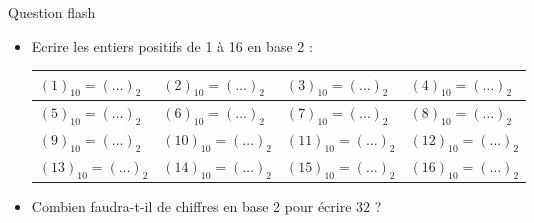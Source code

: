 \documentclass[10pt]{beamer}
\begin{document}
\begin{frame}
	\mframe{\Encodage}
	\begin{exampleblock}{\textcolor{yellow}{\flash} {Question flash}}
		\begin{itemize}
			\item<1-> Ecrire les entiers positifs de 1 à 16 en base 2 :
			      \renewcommand{\arraystretch}{1.5}
			      \begin{tabularx}{0.92\textwidth}{|X|X|X|X|}
				      \hline
				      $(1)_{10}= (\dots)_2$  & $(2)_{10}= (\dots)_2$  & $(3)_{10}= (\dots)_2$  & $(4)_{10}= (\dots)_2$  \\
				      \hline
				      $(5)_{10}= (\dots)_2$  & $(6)_{10}= (\dots)_2$  & $(7)_{10}= (\dots)_2$  & $(8)_{10}= (\dots)_2$  \\
				      \hline
				      $(9)_{10}= (\dots)_2$  & $(10)_{10}=(\dots)_2$  & $(11)_{10}=(\dots)_2$  & $(12)_{10}=(\dots)_2$  \\
				      \hline
				      $(13)_{10}= (\dots)_2$ & $(14)_{10}= (\dots)_2$ & $(15)_{10}= (\dots)_2$ & $(16)_{10}= (\dots)_2$ \\
				      \hline
			      \end{tabularx}
			\item<2->{Combien faudra-t-il de chiffres en base 2 pour écrire $32$ ? \\
			      \lpo[1]}

		\end{itemize}
	\end{exampleblock}
\end{frame}
\end{document}
